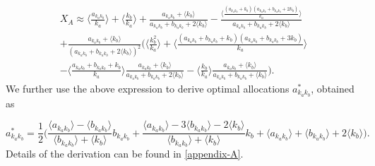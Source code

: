 \begin{equation}
\begin{split}
    X_{A} \approx \langle \frac{a_{k_{a}k_{b}}}{k_{a}} \rangle + \langle \frac{k_{b}}{k_{a}} \rangle + \frac{a_{k_{a}k_{b}}+\langle k_{b} \rangle}{a_{k_{a}k_{b}}+b_{k_{a}k_{b}}+2\langle k_{b} \rangle} - \frac{\langle \frac{(a_{k_{a}k_{b}}+k_{b})(a_{k_{a}k_{b}}+b_{k_{a}k_{b}}+2k_{b})}{k_{a}} \rangle}{a_{k_{a}k_{b}}+b_{k_{a}k_{b}}+2\langle k_{b} \rangle} \\ + \frac{a_{k_{a}k_{b}}+\langle k_{b} \rangle}{(a_{k_{a}k_{b}}+b_{k_{a}k_{b}}+2\langle k_{b} \rangle)^2}\Bigg( \langle \frac{k_{b}^2}{k_{a}} \rangle  + \langle \frac{(a_{k_{a}k_{b}}+b_{k_{a}k_{b}}+k_{b})(a_{k_{a}k_{b}}+b_{k_{a}k_{b}}+3k_{b})}{k_{a}} \rangle \\ 
    - \langle \frac{a_{k_{a}k_{b}}+b_{k_{a}k_{b}}+k_{b}}{k_{a}} \rangle \frac{a_{k_{a}k_{b}}+\langle k_{b} \rangle }{a_{k_{a}k_{b}}+b_{k_{a}k_{b}}+2\langle k_{b}\rangle} - \langle \frac{k_{b}}{k_{a}} \rangle  \frac{a_{k_{a}k_{b}}+\langle k_{b}\rangle}{a_{k_{a}k_{b}}+b_{k_{a}k_{b}}+\langle k_{b}\rangle} \Bigg).
\end{split}
\label{approx-Xa}
\end{equation}
We further use the above expression to derive optimal allocations $a_{k_{a}k_{b}}^*$, obtained as 

\begin{equation}
        a_{k_{a}k_{b}}^* = \frac{1}{2} \Bigg( \frac{\langle a_{k_{a}k_{b}}\rangle - \langle b_{k_{a}k_{b}}\rangle}{\langle b_{k_{a}k_{b}} \rangle +\langle k_{b} \rangle}  b_{k_{a}k_{b}} + \frac{\langle a_{k_{a}k_{b}} \rangle - 3\langle b_{k_{a}k_{b}} \rangle -2 \langle k_{b} \rangle}{\langle b_{k_{a}k_{b}} \rangle +\langle k_{b} \rangle} k_{b} + \langle a_{k_{a}k_{b}}\rangle + \langle b_{k_{a}k_{b}}\rangle+2\langle k_{b} \rangle \Bigg).
  \label{optimal-allo}
\end{equation}
Details of the derivation can be found in \cref{appendix-A}. 






